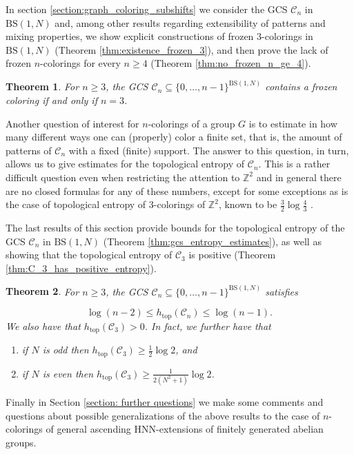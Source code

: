 \documentclass[letterpaper,11pt,reqno]{amsart}
\theoremstyle{plain}
\newtheorem{theorem}{Theorem}[section]
\theoremstyle{definition}
\newcommand{\BS}[1][N]{\mathrm{BS}(1,#1)}
\def\htop{h_{\mathrm{top}}}
\begin{document}
In section \ref{section:graph_coloring_subshifts} we consider the GCS $\mathcal{C}_n$ in $\BS$ and, among other results regarding extensibility of patterns and mixing properties, we show explicit constructions of frozen $3$-colorings in $\BS$ (Theorem \ref{thm:existence_frozen_3}), and then prove the lack of frozen $n$-colorings for every $n\ge 4$ (Theorem \ref{thm:no_frozen_n_ge_4}).

\begin{theorem}\label{thm:summary_gcs_frozen_colorings}
	For $n\ge 3$, the GCS $\mathcal{C}_n\subseteq\{0,\ldots,n-1\}^{\BS}$ contains a frozen coloring if and only if $n=3$.
\end{theorem}	

Another question of interest for $n$-colorings of a group $G$ is to estimate in how many different ways one can (properly) color a finite set, that is, the amount of patterns of $\mathcal{C}_n$ with a fixed (finite) support. The answer to this question, in turn, allows us to give estimates for the topological entropy of $\mathcal{C}_n$. This is a rather difficult question even when restricting the attention to $\mathbb{Z}^2$ and in general there are no closed formulas for any of these numbers, except for some exceptions as is the case of topological entropy of $3$-colorings of $\mathbb{Z}^2$, known to be $\frac{3}{2}\log\frac{4}{3}$ \cite{Lieb:1967zz}.


The last results of this section provide bounds for the topological entropy of the GCS $\mathcal{C}_n$ in $\BS$ (Theorem \ref{thm:gcs_entropy_estimates}), as well as showing that the topological entropy of $\mathcal{C}_3$ is positive (Theorem \ref{thm:C_3_has_positive_entropy}).
\begin{theorem} \label{thm:summary_gcs_entropy}
	For $n\ge 3$, the GCS $\mathcal{C}_n\subseteq\{0,\ldots,n-1\}^{\BS}$ satisfies
	
	$$
	\log(n-2)\le\htop(\mathcal{C}_n)\le\log(n-1).
	$$
	We also have that $\htop(\mathcal{C}_3)>0$. In fact, we further have that
	\begin{enumerate}
		\item if $N$ is odd then $\htop(\mathcal{C}_3)\ge\frac{1}{2}\log 2$, and
		\item if $N$ is even then $\htop(\mathcal{C}_3)\ge\frac{1}{2(N^2+1)}\log 2$.
	\end{enumerate}
\end{theorem}

Finally in Section \ref{section: further questions} we make some comments and questions about possible generalizations of the above results to the case of $n$-colorings of general ascending HNN-extensions of finitely generated abelian groups.
\end{document}
